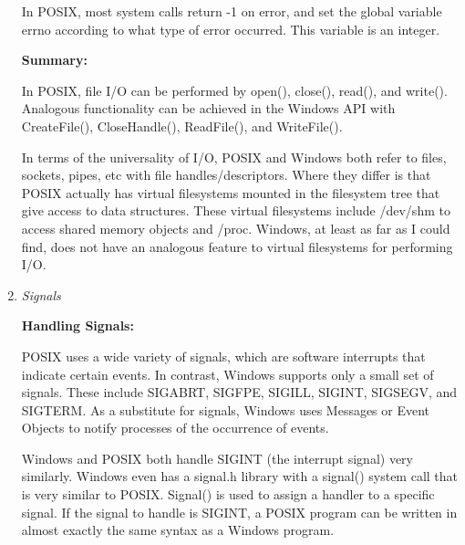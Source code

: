 \documentclass[letterpaper,10pt,titlepage]{article}
\newcommand{\tab}{\hspace*{2em}} %
\begin{document}
\begin{enumerate}
\tab In POSIX, most system calls return -1 on error, and set the global variable errno according to what type of error occurred. This variable is an integer. \newline 

\textbf{Summary:}\newline

\tab In POSIX, file I/O can be performed by open(), close(), read(), and write(). Analogous functionality can be achieved in the Windows API with CreateFile(), CloseHandle(), ReadFile(), and WriteFile(). \newline

\tab In terms of the universality of I/O, POSIX and Windows both refer to files, sockets, pipes, etc with file handles/descriptors. Where they differ is that POSIX actually has virtual filesystems mounted in the filesystem tree that give access to data structures. These virtual filesystems include /dev/shm to access shared memory objects and /proc. Windows, at least as far as I could find, does not have an analogous feature to virtual filesystems for performing I/O. \newline

\item \emph{Signals} \newline

\textbf{Handling Signals:}\newline

\tab POSIX uses a wide variety of signals, which are software interrupts that indicate certain events. In contrast, Windows supports only a small set of signals. These include SIGABRT, SIGFPE, SIGILL, SIGINT, SIGSEGV, and SIGTERM. As a substitute for signals, Windows uses Messages or Event Objects to notify processes of the occurrence of events.\newline

\tab Windows and POSIX both handle SIGINT (the interrupt signal) very similarly. Windows even has a signal.h library with a signal() system call that is very similar to POSIX. Signal() is used to assign a handler to a specific signal. If the signal to handle is SIGINT, a POSIX program can be written in almost exactly the same syntax as a Windows program.\newline


\end{enumerate}
\end{document}
